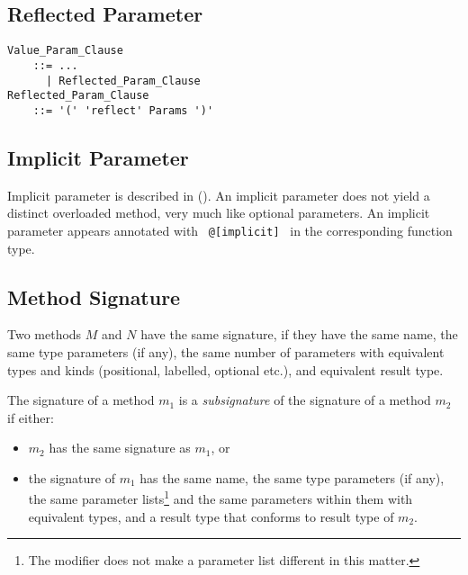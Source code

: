 \subsection{Reflected Parameter}
\label{sec:reflected-parameter}

\grammar\begin{lstlisting}[deletekeywords={with}]
Value_Param_Clause
    ::= ...
      | Reflected_Param_Clause
Reflected_Param_Clause
    ::= '(' 'reflect' Params ')'
\end{lstlisting}





\subsection{Implicit Parameter}
\label{sec:implicit-parameter}

Implicit parameter is described in (). An implicit parameter does not yield a distinct overloaded method, very much like optional parameters. An implicit parameter appears annotated with ~\lstinline[deletekeywords={implicit}]!@[implicit]!~ in the corresponding function type. 





\subsection{Method Signature}
\label{sec:method-signature}

Two methods $M$ and $N$ have the same signature, if they have the same name, the same type parameters (if any), the same number of parameters with equivalent types and kinds (positional, labelled, optional etc.), and equivalent result type. 

The signature of a method $m_1$ is a {\em subsignature} of the signature of a method $m_2$ if either:
\begin{itemize}
  \item $m_2$ has the same signature as $m_1$, or
  \item the signature of $m_1$ has the same name, the same type parameters (if any), the same parameter lists\footnote{The  modifier does not make a parameter list different in this matter.} and the same parameters within them with equivalent types, and a result type that conforms to result type of $m_2$. 
\end{itemize}

